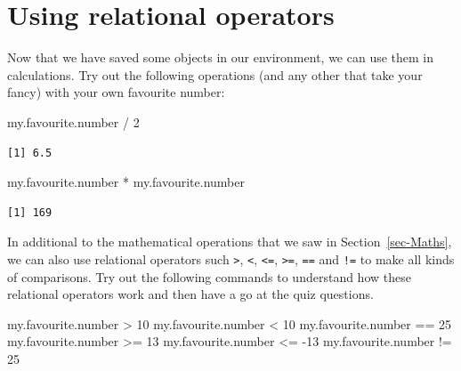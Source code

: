 \documentclass[
  letterpaper,
  DIV=11,
  numbers=noendperiod]{scrreprt}
\newenvironment{Shaded}{\begin{snugshade}}{\end{snugshade}}
\newcommand{\DecValTok}[1]{\textcolor[rgb]{0.68,0.00,0.00}{#1}}
\newcommand{\NormalTok}[1]{\textcolor[rgb]{0.00,0.23,0.31}{#1}}
\newcommand{\SpecialCharTok}[1]{\textcolor[rgb]{0.37,0.37,0.37}{#1}}
\begin{document}
\section{Using relational operators}\label{sec-RelationalOperators}

Now that we have saved some objects in our environment, we can use them
in calculations. Try out the following operations (and any other that
take your fancy) with your own favourite number:

\begin{Shaded}
\begin{Highlighting}[]
\NormalTok{my.favourite.number }\SpecialCharTok{/} \DecValTok{2}
\end{Highlighting}
\end{Shaded}

\begin{verbatim}
[1] 6.5
\end{verbatim}

\begin{Shaded}
\begin{Highlighting}[]
\NormalTok{my.favourite.number }\SpecialCharTok{*}\NormalTok{ my.favourite.number}
\end{Highlighting}
\end{Shaded}

\begin{verbatim}
[1] 169
\end{verbatim}

In additional to the mathematical operations that we saw in
Section~\ref{sec-Maths}, we can also use relational operators such
\texttt{\textgreater{}}, \texttt{\textless{}}, \texttt{\textless{}=},
\texttt{\textgreater{}=}, \texttt{==} and \texttt{!=} to make all kinds
of comparisons. Try out the following commands to understand how these
relational operators work and then have a go at the quiz questions.

\begin{Shaded}
\begin{Highlighting}[]
\NormalTok{my.favourite.number }\SpecialCharTok{\textgreater{}} \DecValTok{10}
\NormalTok{my.favourite.number }\SpecialCharTok{\textless{}} \DecValTok{10}
\NormalTok{my.favourite.number }\SpecialCharTok{==} \DecValTok{25}
\NormalTok{my.favourite.number }\SpecialCharTok{\textgreater{}=} \DecValTok{13}
\NormalTok{my.favourite.number }\SpecialCharTok{\textless{}=} \SpecialCharTok{{-}}\DecValTok{13}
\NormalTok{my.favourite.number }\SpecialCharTok{!=} \DecValTok{25}
\end{Highlighting}
\end{Shaded}
\end{document}
